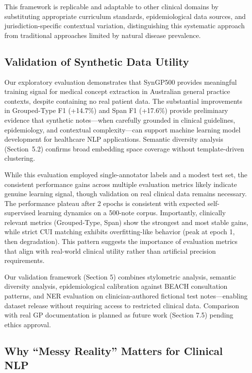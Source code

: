 \documentclass[11pt]{article}
\begin{document}
This framework is replicable and adaptable to other clinical domains by substituting appropriate curriculum standards, epidemiological data sources, and jurisdiction-specific contextual variation, distinguishing this systematic approach from traditional approaches limited by natural disease prevalence.

\subsection{Validation of Synthetic Data Utility}

Our exploratory evaluation demonstrates that SynGP500 provides meaningful training signal for medical concept extraction in Australian general practice contexts, despite containing no real patient data. The substantial improvements in Grouped-Type F1 (+14.7\%) and Span F1 (+17.6\%) provide preliminary evidence that synthetic notes—when carefully grounded in clinical guidelines, epidemiology, and contextual complexity—can support machine learning model development for healthcare NLP applications. Semantic diversity analysis (Section~5.2) confirms broad embedding space coverage without template-driven clustering.

While this evaluation employed single-annotator labels and a modest test set, the consistent performance gains across multiple evaluation metrics likely indicate genuine learning signal, though validation on real clinical data remains necessary. The performance plateau after 2 epochs is consistent with expected self-supervised learning dynamics on a 500-note corpus. Importantly, clinically relevant metrics (Grouped-Type, Span) show the strongest and most stable gains, while strict CUI matching exhibits overfitting-like behavior (peak at epoch 1, then degradation). This pattern suggests the importance of evaluation metrics that align with real-world clinical utility rather than artificial precision requirements.

Our validation framework (Section 5) combines stylometric analysis, semantic diversity analysis, epidemiological calibration against BEACH consultation patterns, and NER evaluation on clinician-authored fictional test notes—enabling dataset release without requiring access to restricted clinical data. Comparison with real GP documentation is planned as future work (Section 7.5) pending ethics approval.

\subsection{Why ``Messy Reality'' Matters for Clinical NLP}
\end{document}
